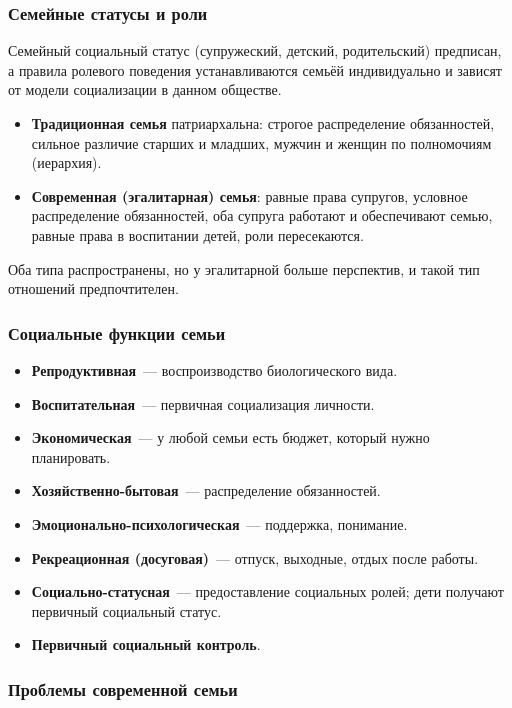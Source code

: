 \documentclass[12pt]{article}
\begin{document}
	\subsubsection{Семейные статусы и роли}

	Семейный социальный статус (супружеский, детский, родительский) предписан, а правила ролевого поведения устанавливаются семьёй индивидуально и зависят от модели социализации в данном обществе.

	\begin{itemize}
		\item \textbf{Традиционная семья} патриархальна: строгое распределение обязанностей, сильное различие старших и младших, мужчин и женщин по полномочиям (иерархия).
		\item \textbf{Современная (эгалитарная) семья}: равные права супругов, условное распределение обязанностей, оба супруга работают и обеспечивают семью, равные права в воспитании детей, роли пересекаются.
	\end{itemize}

	Оба типа распространены, но у эгалитарной больше перспектив, и такой тип отношений предпочтителен.

	\subsubsection{Социальные функции семьи}

	\begin{itemize}
		\item \textbf{Репродуктивная}~--- воспроизводство биологического вида.
		\item \textbf{Воспитательная}~--- первичная социализация личности.
		\item \textbf{Экономическая}~--- у любой семьи есть бюджет, который нужно планировать.
		\item \textbf{Хозяйственно-бытовая}~--- распределение обязанностей.
		\item \textbf{Эмоционально-психологическая}~--- поддержка, понимание.
		\item \textbf{Рекреационная (досуговая)}~--- отпуск, выходные, отдых после работы.
		\item \textbf{Социально-статусная}~--- предоставление социальных ролей; дети получают первичный социальный статус.
		\item \textbf{Первичный социальный контроль}.
	\end{itemize}

	\subsubsection{Проблемы современной семьи}
\end{document}
